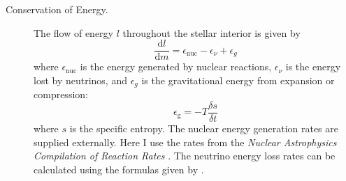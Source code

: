 \begin{description}
    \item[Conservation of Energy.]
    The flow of energy $l$ throughout the stellar interior is given by 
    \begin{equation} \label{eq:energy} \boxed{
        \frac{\text{d}l}{\text{d}m}
        =
        \epsilon_{\text{nuc}} - \epsilon_\nu + \epsilon_g %
    }\end{equation}
    where $\epsilon_{\text{nuc}}$ is the energy generated by nuclear reactions, $\epsilon_\nu$ is the energy lost by neutrinos, and $\epsilon_g$ is the gravitational energy from expansion or compression:
    \begin{equation} \label{eq:eps-g}
        \epsilon_{\text{g}} = -T \frac{\delta s}{\delta t}
    \end{equation}
    where $s$ is the specific entropy. 
    The nuclear energy generation rates are supplied externally. 
    Here I use the rates from the \emph{Nuclear Astrophysics Compilation of Reaction Rates} \citep[\textsc{NACRE},][]{1999NuPhA.656....3A}. 
    The neutrino energy loss rates can be calculated using the formulas given by \citet{1996ApJS..102..411I}. 
    
    

\end{description}
